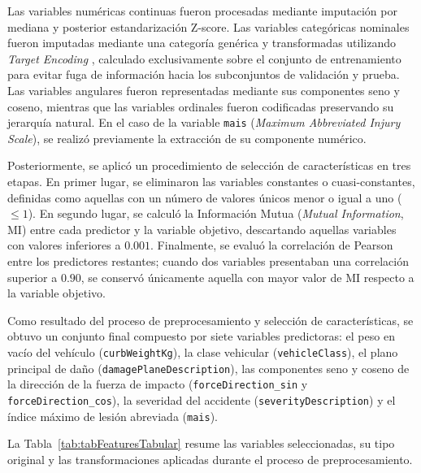 \documentclass[esp]{SpeedEstimationAI_paper}
\begin{document}
Las variables numéricas continuas fueron procesadas mediante imputación por mediana y posterior estandarización Z-score. Las variables categóricas nominales fueron imputadas mediante una categoría genérica y transformadas utilizando \textit{Target Encoding} \cite{micci2001preprocessing}, calculado exclusivamente sobre el conjunto de entrenamiento para evitar fuga de información hacia los subconjuntos de validación y prueba. Las variables angulares fueron representadas mediante sus componentes seno y coseno, mientras que las variables ordinales fueron codificadas preservando su jerarquía natural. En el caso de la variable \texttt{mais} (\textit{Maximum Abbreviated Injury Scale}), se realizó previamente la extracción de su componente numérico.

Posteriormente, se aplicó un procedimiento de selección de características en tres etapas. En primer lugar, se eliminaron las variables constantes o cuasi-constantes, definidas como aquellas con un número de valores únicos menor o igual a uno ($\leq 1$). En segundo lugar, se calculó la Información Mutua (\textit{Mutual Information}, MI) entre cada predictor y la variable objetivo, descartando aquellas variables con valores inferiores a $0.001$. Finalmente, se evaluó la correlación de Pearson entre los predictores restantes; cuando dos variables presentaban una correlación superior a $0.90$, se conservó únicamente aquella con mayor valor de MI respecto a la variable objetivo.

Como resultado del proceso de preprocesamiento y selección de características, se obtuvo un conjunto final compuesto por siete variables predictoras: el peso en vacío del vehículo (\texttt{curbWeightKg}), la clase vehicular (\texttt{vehicleClass}), el plano principal de daño (\texttt{damagePlaneDescription}), las componentes seno y coseno de la dirección de la fuerza de impacto (\texttt{forceDirection\_sin} y \texttt{forceDirection\_cos}), la severidad del accidente (\texttt{severityDescription}) y el índice máximo de lesión abreviada (\texttt{mais}).

La Tabla~\ref{tab:tabFeaturesTabular} resume las variables seleccionadas, su tipo original y las transformaciones aplicadas durante el proceso de preprocesamiento.
\end{document}
